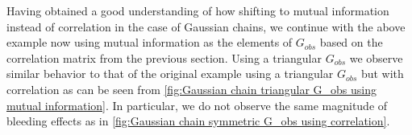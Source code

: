 \documentclass[../Thesis.tex]{subfiles}
\begin{document}

Having obtained a good understanding of how shifting to mutual information instead of correlation in the case of Gaussian chains, we continue with the above example now using mutual information as the elements of $G_{obs}$ based on the correlation matrix from the previous section. Using a triangular $G_{obs}$ we observe similar behavior to that of the original example using a triangular $G_{obs}$ but with correlation as can be seen from \autoref{fig:Gaussian chain triangular G_obs using mutual information}. In particular, we do not observe the same magnitude of bleeding effects as in \autoref{fig:Gaussian chain symmetric G_obs using correlation}.
\end{document}
